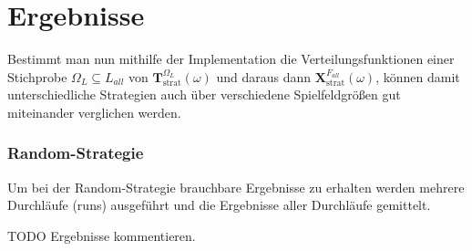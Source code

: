 \documentclass[a4paper,12pt]{llncs}
\numberwithin{equation}{section}
\DeclareMathOperator{\strat}{strat}
\begin{document}


\section{Ergebnisse}


Bestimmt man nun mithilfe der Implementation die Verteilungsfunktionen einer Stichprobe $\Omega_L \subseteq L_{all}$ von $\mathbf{T}^{\Omega_L}_{\strat}(\omega)$ und daraus dann $\mathbf{X}^{F_{all}}_{\strat}(\omega)$, können damit unterschiedliche Strategien auch über verschiedene Spielfeldgrößen gut miteinander verglichen werden.

\subsubsection{Random-Strategie}

Um bei der Random-Strategie brauchbare Ergebnisse zu erhalten werden mehrere Durchläufe (runs) ausgeführt und die Ergebnisse aller Durchläufe gemittelt.

TODO Ergebnisse kommentieren.

\begin{landscape}
	
	\label{fig:random1}
\end{landscape}

\begin{landscape}
	
	\label{fig:random2}
\end{landscape}

\begin{landscape}
	
	\label{fig:fullGrid1}
\end{landscape}

\begin{landscape}
	
	\label{fig:fullGrid2}
\end{landscape}


\begin{landscape}
	
	\label{fig:fullGrid3}
\end{landscape}


\begin{landscape}
	
	\label{fig:fullGrid4}
\end{landscape}
\end{document}
